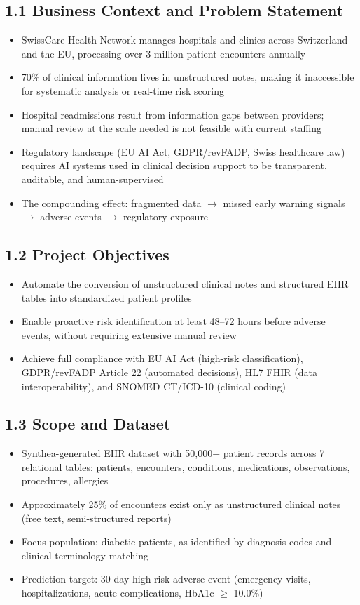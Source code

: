 \documentclass[11pt,a4paper]{article}
\begin{document}
\subsection{1.1 Business Context and Problem Statement}
\begin{itemize}
\item SwissCare Health Network manages hospitals and clinics across Switzerland and the EU, processing over 3 million patient encounters annually
\item 70\% of clinical information lives in unstructured notes, making it inaccessible for systematic analysis or real-time risk scoring
\item Hospital readmissions result from information gaps between providers; manual review at the scale needed is not feasible with current staffing
\item Regulatory landscape (EU AI Act, GDPR/revFADP, Swiss healthcare law) requires AI systems used in clinical decision support to be transparent, auditable, and human-supervised
\item The compounding effect: fragmented data $\rightarrow$ missed early warning signals $\rightarrow$ adverse events $\rightarrow$ regulatory exposure
\end{itemize}

\subsection{1.2 Project Objectives}
\begin{itemize}
\item Automate the conversion of unstructured clinical notes and structured EHR tables into standardized patient profiles
\item Enable proactive risk identification at least 48--72 hours before adverse events, without requiring extensive manual review
\item Achieve full compliance with EU AI Act (high-risk classification), GDPR/revFADP Article 22 (automated decisions), HL7 FHIR (data interoperability), and SNOMED CT/ICD-10 (clinical coding)
\end{itemize}

\subsection{1.3 Scope and Dataset}
\begin{itemize}
\item Synthea-generated EHR dataset with 50,000+ patient records across 7 relational tables: patients, encounters, conditions, medications, observations, procedures, allergies
\item Approximately 25\% of encounters exist only as unstructured clinical notes (free text, semi-structured reports)
\item Focus population: diabetic patients, as identified by diagnosis codes and clinical terminology matching
\item Prediction target: 30-day high-risk adverse event (emergency visits, hospitalizations, acute complications, HbA1c $\geq$ 10.0\%)
\end{itemize}
\end{document}

